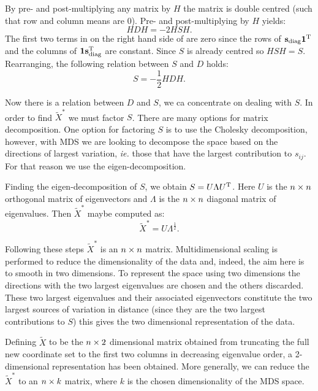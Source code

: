 By pre- and post-multiplying any matrix by $H$ the matrix is double centred (such that row and column means are 0). Pre- and post-multiplying  by $H$ yields:
\begin{equation}
HDH = -2HSH.
\end{equation}
The first two terms in on the right hand side of  are zero since the rows of $\mathbf{s}_\text{diag}\mathbf{1}^{\text{T}}$ and the columns of  $\mathbf{1}\mathbf{s}_\text{diag}^{\text{T}}$ are constant. Since $S$ is already centred so $HSH=S$. Rearranging, the following relation between $S$ and $D$ holds:
\begin{equation}
S = -\frac{1}{2}HDH.
\end{equation}

Now there is a relation between $D$ and $S$, we ca concentrate on dealing with $S$. In order to find $\tilde{X}^{*}$ we must factor $S$. There are many options for matrix decomposition. One option for factoring $S$ is to use the Cholesky decomposition, however, with MDS we are looking to decompose the space based on the directions of largest variation, \emph{ie.} those that have the largest contribution to $s_{ij}$. For that reason we use the eigen-decomposition.

Finding the eigen-decomposition of $S$, we obtain $S=U\Lambda U^{\text{T}}$. Here $U$ is the $n \times n$ orthogonal matrix of eigenvectors and $\Lambda$ is the $n \times n$ diagonal matrix of eigenvalues. Then $\tilde{X}^*$ maybe computed as:
\begin{equation}
\tilde{X}^*=U\Lambda^{\frac{1}{2}}.
\end{equation}

Following these steps $\tilde{X}^*$ is an $n \times n$ matrix. Multidimensional scaling is performed to reduce the dimensionality of the data and, indeed, the aim here is to smooth in two dimensions. To represent the space using two dimensions the directions with the two largest eigenvalues are chosen and the others discarded. These two largest eigenvalues and their associated eigenvectors constitute the two largest sources of variation in distance (since they are the two largest contributions to $S$) this gives the two dimensional representation of the data. 

Defining $\tilde{X}$ to be the $n \times 2$ dimensional matrix obtained from truncating the full new coordinate set to the first two columns in decreasing eigenvalue order, a 2-dimensional representation has been obtained. More generally, we can reduce the $\tilde{X}^*$ to an $n \times k$ matrix, where $k$ is the chosen dimensionality of the MDS space.

